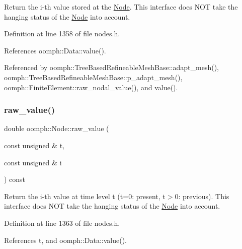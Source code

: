 Return the i-\/th value stored at the \hyperlink{classoomph_1_1Node}{Node}. This interface does N\+OT take the hanging status of the \hyperlink{classoomph_1_1Node}{Node} into account. 



Definition at line 1358 of file nodes.\+h.



References oomph\+::\+Data\+::value().



Referenced by oomph\+::\+Tree\+Based\+Refineable\+Mesh\+Base\+::adapt\+\_\+mesh(), oomph\+::\+Tree\+Based\+Refineable\+Mesh\+Base\+::p\+\_\+adapt\+\_\+mesh(), oomph\+::\+Finite\+Element\+::raw\+\_\+nodal\+\_\+value(), and value().

\mbox{\label{classoomph_1_1Node_aec4e3050f0b7b85ef2ffb11a12c64214}} 
\subsubsection{\texorpdfstring{raw\+\_\+value()}{raw\_value()}\hspace{0.1cm}{\footnotesize\ttfamily [2/2]}}
{\footnotesize\ttfamily double oomph\+::\+Node\+::raw\+\_\+value (\begin{DoxyParamCaption}\item[{const unsigned \&}]{t,  }\item[{const unsigned \&}]{i }\end{DoxyParamCaption}) const\hspace{0.3cm}{\ttfamily [inline]}}



Return the i-\/th value at time level t (t=0\+: present, t$>$0\+: previous). This interface does N\+OT take the hanging status of the \hyperlink{classoomph_1_1Node}{Node} into account. 



Definition at line 1363 of file nodes.\+h.



References t, and oomph\+::\+Data\+::value().

\mbox{\label{classoomph_1_1Node_a4a4bfedfe5c4278f91e4c0ba9d3e3549}} 
